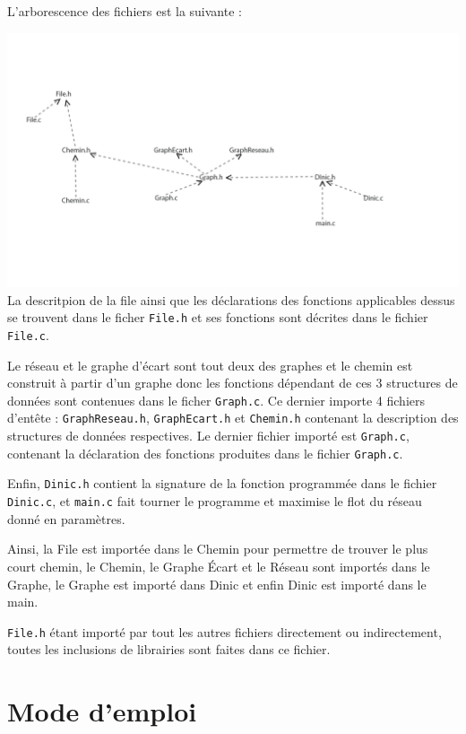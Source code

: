 \documentclass[11pt, a4paper]{report}
\begin{document}
	L'arborescence des fichiers est la suivante :

	\includegraphics[width=1.2\textwidth]{images/fichiers.png}\\

	La descritpion de la file ainsi que les déclarations des fonctions applicables dessus se trouvent dans le ficher \verb|File.h| et ses fonctions sont décrites dans le fichier \verb|File.c|.

	Le réseau et le graphe d'écart sont tout deux des graphes et le chemin est construit à partir d'un graphe donc les fonctions dépendant de ces 3 structures de données sont contenues dans le ficher \verb|Graph.c|. Ce dernier importe 4 fichiers d'entête : \verb|GraphReseau.h|, \verb|GraphEcart.h| et \verb|Chemin.h| contenant la description des structures de données respectives. Le dernier fichier importé est \verb|Graph.c|, contenant la déclaration des fonctions produites dans le fichier \verb|Graph.c|.

	Enfin, \verb|Dinic.h| contient la signature de la fonction programmée dans le fichier \verb|Dinic.c|, et \verb|main.c| fait tourner le programme et maximise le flot du réseau donné en paramètres.

	Ainsi, la File est importée dans le Chemin pour permettre de trouver le plus court chemin, le Chemin, le Graphe Écart et le Réseau sont importés dans le Graphe, le Graphe est importé dans Dinic et enfin Dinic est importé dans le main.

	\verb|File.h| étant importé par tout les autres fichiers directement ou indirectement, toutes les inclusions de librairies sont faites dans ce fichier.

	\chapter{Mode d'emploi}
\end{document}
